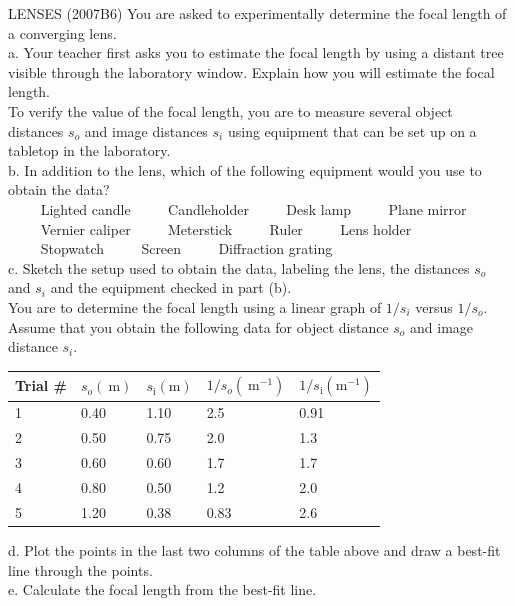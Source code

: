 \begin{enumerate}
LENSES (2007B6) You are asked to experimentally determine the focal length of a converging lens.\\
a. Your teacher first asks you to estimate the focal length by using a distant tree visible through the laboratory window. Explain how you will estimate the focal length.\\
To verify the value of the focal length, you are to measure several object distances $s_{o}$ and image distances $s_{i}$ using equipment that can be set up on a tabletop in the laboratory.\\
b. In addition to the lens, which of the following equipment would you use to obtain the data?\\
$\qquad$ Lighted candle $\qquad$ Candleholder $\qquad$ Desk lamp $\qquad$ Plane mirror\\
$\qquad$ Vernier caliper $\qquad$ Meterstick $\qquad$ Ruler $\qquad$ Lens holder\\
$\qquad$ Stopwatch $\qquad$ Screen $\qquad$ Diffraction grating\\
c. Sketch the setup used to obtain the data, labeling the lens, the distances $s_{o}$ and $s_{i}$ and the equipment checked in part (b).\\
You are to determine the focal length using a linear graph of $1 / s_{i}$ versus $1 / s_{o}$. Assume that you obtain the following data for object distance $s_{o}$ and image distance $s_{i}$.

\begin{center}
\begin{tabular}{|l|l|l|l|l|}
\hline
Trial \# & $s_{o}(\mathrm{~m})$ & $s_{\mathrm{i}}(\mathrm{m})$ & $1 / s_{o}\left(\mathrm{~m}^{-1}\right)$ & $1 / s_{\mathrm{i}}\left(\mathrm{m}^{-1}\right)$ \\
\hline
1 & 0.40 & 1.10 & 2.5 & 0.91 \\
\hline
2 & 0.50 & 0.75 & 2.0 & 1.3 \\
\hline
3 & 0.60 & 0.60 & 1.7 & 1.7 \\
\hline
4 & 0.80 & 0.50 & 1.2 & 2.0 \\
\hline
5 & 1.20 & 0.38 & 0.83 & 2.6 \\
\hline
\end{tabular}
\end{center}

d. Plot the points in the last two columns of the table above and draw a best-fit line through the points.\\
e. Calculate the focal length from the best-fit line.


\end{enumerate}
